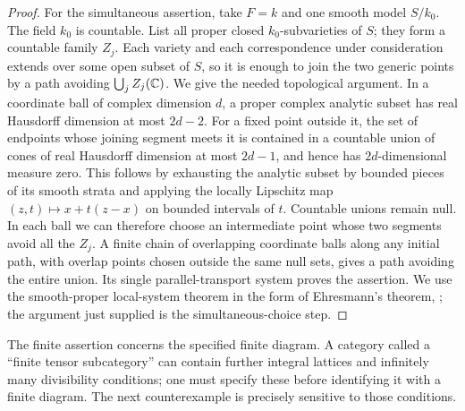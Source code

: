 \begin{proof}
For the simultaneous assertion, take $F=k$ and one smooth model $S/k_0$. The field $k_0$ is countable. List all proper closed $k_0$-subvarieties of $S$; they form a countable family $Z_j$. Each variety and each correspondence under consideration extends over some open subset of $S$, so it is enough to join the two generic points by a path avoiding $\bigcup_j Z_j(\mathbb C)$. We give the needed topological argument. In a coordinate ball of complex dimension $d$, a proper complex analytic subset has real Hausdorff dimension at most $2d-2$. For a fixed point outside it, the set of endpoints whose joining segment meets it is contained in a countable union of cones of real Hausdorff dimension at most $2d-1$, and hence has $2d$-dimensional measure zero. This follows by exhausting the analytic subset by bounded pieces of its smooth strata and applying the locally Lipschitz map $(z,t)\mapsto x+t(z-x)$ on bounded intervals of $t$. Countable unions remain null. In each ball we can therefore choose an intermediate point whose two segments avoid all the $Z_j$. A finite chain of overlapping coordinate balls along any initial path, with overlap points chosen outside the same null sets, gives a path avoiding the entire union. Its single parallel-transport system proves the assertion. We use the smooth-proper local-system theorem in the form of Ehresmann's theorem, \cite[Theorem 12.1.1]{Arapura2003}; the argument just supplied is the simultaneous-choice step.
\end{proof}

The finite assertion concerns the specified finite diagram. A category called a ``finite tensor subcategory'' can contain further integral lattices and infinitely many divisibility conditions; one must specify these before identifying it with a finite diagram. The next counterexample is precisely sensitive to those conditions.

